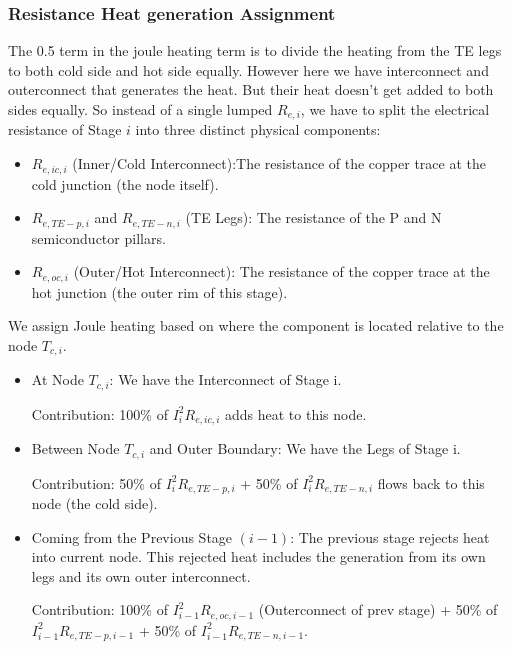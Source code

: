 \documentclass[10pt,a4paper,twocolumn]{article}
\begin{document}
\subsubsection{Resistance Heat generation Assignment}

The 0.5 term in the joule heating term is to divide the heating from the TE legs to both cold side and hot side equally. However here we have interconnect and outerconnect that generates the heat. But their heat doesn't get added to both sides equally. So instead of a single lumped $R_{e,i}$, we have to  split the electrical resistance of Stage $i$ into three distinct physical components:

\begin{itemize}
	\item $R_{e,ic,i}$ (Inner/Cold Interconnect):The resistance of the copper trace at the cold junction (the node itself).
	\item $R_{e,TE-p,i}$ and $R_{e,TE-n,i}$ (TE Legs): The resistance of the P and N semiconductor pillars.
	\item $R_{e,oc,i}$ (Outer/Hot Interconnect): The resistance of the copper trace at the hot junction (the outer rim of this stage).
\end{itemize}

We assign Joule heating based on where the component is located relative to the node $T_{c,i}$.
\begin{itemize}
	\item At Node $T_{c,i}$: We have the Interconnect of Stage i.
	      
	      Contribution: 100\% of $I_i^2 R_{e,ic,i}$ adds heat to this node.
	      
	\item  Between Node $T_{c,i}$ and Outer Boundary: We have the Legs of Stage i.
	      
	      Contribution: 50\% of $I_i^2 R_{e,TE-p,i}$ + 50\% of $I_i^2 R_{e,TE-n,i}$ flows back to this node (the cold side).
	      
	\item  Coming from the Previous Stage $(i-1)$: The previous stage rejects heat into  current node. This rejected heat includes the generation from its own legs and its own outer interconnect.
	      
	      Contribution: 100\% of $I_{i-1}^2 R_{e,oc,i-1}$ (Outerconnect of prev stage) + 50\% of $I_{i-1}^2 R_{e,TE-p,i-1}$ + 50\% of $I_{i-1}^2 R_{e,TE-n,i-1}$.
\end{itemize}
\end{document}
